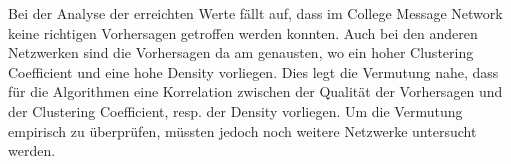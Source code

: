 \begin{table}[]
    \centering
    \label{tab_accuracy_iter}
    \caption{Erreichte Accuracy in \%}
\end{table}

Bei der Analyse der erreichten Werte fällt auf, dass im College Message Network keine richtigen Vorhersagen getroffen werden konnten.
Auch bei den anderen Netzwerken sind die Vorhersagen da am genausten, wo ein hoher Clustering Coefficient und eine hohe Density vorliegen.
Dies legt die Vermutung nahe, dass für die Algorithmen eine Korrelation zwischen der Qualität der Vorhersagen und der Clustering Coefficient, resp. der Density vorliegen.
Um die Vermutung empirisch zu überprüfen, müssten jedoch noch weitere Netzwerke untersucht werden.

